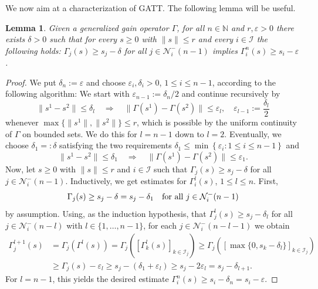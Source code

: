 \documentclass[10pt, oneside, a4paper]{article}
\newcommand{\N}{\mathbb{N}}
\newcommand{\ep}{\varepsilon}
\newcommand{\IC}{\mathcal{I}}
\newcommand{\NC}{\mathcal{N}}
\newtheorem{lemma}{Lemma}[section]
\begin{document}
We now aim at a characterization of GATT. The following lemma will be useful.%

\begin{lemma}\label{lem_aux_stability}
Given a generalized gain operator $\Gamma$, for all $n \in \N$ and $r,\ep > 0$ there exists $\delta > 0$ such that for every $s \geq 0$ with $\|s\| \leq r$ and every $i \in \IC$ the following holds: $\Gamma_j(s) \geq s_j - \delta$ for all $j \in \NC^-_i(n-1)$ implies $\Gamma^n_i(s) \geq s_i - \ep$.
\end{lemma}

\begin{proof}
We put $\delta_n := \ep$ and choose $\ep_i,\delta_i > 0$, $1 \leq i \leq n - 1$, according to the following algorithm: We start with $\ep_{n-1} := \delta_n/2$ and continue recursively by%
\begin{equation*}
  \|s^1 - s^2\| \leq \delta_l \quad \Rightarrow \quad \|\Gamma(s^1) - \Gamma(s^2)\| \leq \ep_l, \quad \ep_{l-1} := \frac{\delta_l}{2}%
\end{equation*}
whenever $\max\{\|s^1\|,\|s^2\|\} \leq r$, which is possible by the uniform continuity of $\Gamma$ on bounded sets. We do this for $l = n - 1$ down to $l = 2$. Eventually, we choose $\delta_1 =: \delta$ satisfying the two requirements $\delta_1 \leq \min\left\{ \ep_i : 1 \leq i \leq n - 1 \right\}$ and%
\begin{equation*}
  \|s^1 - s^2\| \leq \delta_1 \quad \Rightarrow \quad \|\Gamma(s^1) - \Gamma(s^2)\| \leq \ep_1.%
\end{equation*}
Now, let $s \geq 0$ with $\|s\| \leq r$ and $i \in \IC$ such that $\Gamma_j(s) \geq s_j - \delta$ for all $j \in \NC^-_i(n-1)$. Inductively, we get estimates for $\Gamma^l_i(s)$, $1 \leq l \leq n$. First,%
\begin{equation*}
  \Gamma_j(s) \geq s_j - \delta = s_j - \delta_1 \mbox{\quad for all\ } j \in \NC^-_i(n-1)%
\end{equation*}
by assumption. Using, as the induction hypothesis, that $\Gamma^l_j(s) \geq s_j - \delta_l$ for all $j \in \NC^-_i(n - l)$ with $l \in \{1,\ldots,n-1\}$, for each $j \in \NC^-_i(n - l - 1)$ we obtain%
\begin{align*}
  \Gamma^{l + 1}_j(s) &= \Gamma_j(\Gamma^l(s)) = \Gamma_j( [\Gamma^l_k(s)]_{k \in \IC_j} ) \geq \Gamma_j( [\max\{0,s_k - \delta_l\}]_{k \in \IC_j} ) \\
	&\geq \Gamma_j(s) - \ep_l \geq s_j - (\delta_1 + \ep_l) \geq s_j - 2\ep_l = s_j - \delta_{l + 1}.%
\end{align*}
For $l = n - 1$, this yields the desired estimate $\Gamma^n_i(s) \geq s_i - \delta_n = s_i - \ep$.
\end{proof}
\end{document}
